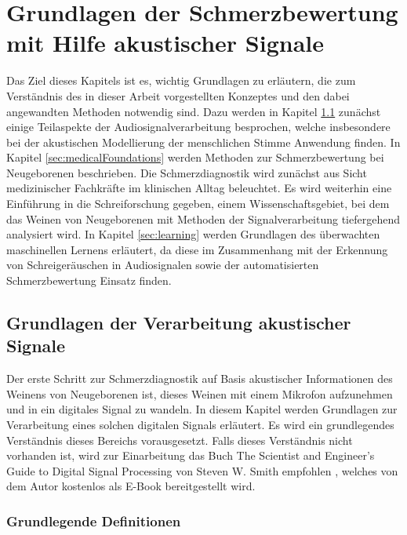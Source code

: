 \chapter{Grundlagen der Schmerzbewertung mit Hilfe akustischer Signale}
\label{sec:foundations}

Das Ziel dieses Kapitels ist es, wichtig Grundlagen zu erläutern, die zum Verständnis des in dieser Arbeit vorgestellten Konzeptes und den dabei angewandten Methoden notwendig sind. Dazu werden in Kapitel \ref{sec:signal_foundations} zunächst einige Teilaspekte der Audiosignalverarbeitung besprochen, welche insbesondere bei der akustischen Modellierung der menschlichen Stimme Anwendung finden. In Kapitel \ref{sec:medicalFoundations} werden Methoden zur Schmerzbewertung bei Neugeborenen beschrieben. Die Schmerzdiagnostik wird zunächst aus Sicht medizinischer Fachkräfte im klinischen Alltag beleuchtet. Es wird weiterhin eine Einführung in die \glqq Schreiforschung\grqq{} gegeben, einem Wissenschaftsgebiet, bei dem das Weinen von Neugeborenen mit Methoden der Signalverarbeitung tiefergehend analysiert wird. In Kapitel \ref{sec:learning} werden Grundlagen des überwachten maschinellen Lernens erläutert, da diese im Zusammenhang mit der Erkennung von Schreigeräuschen in Audiosignalen sowie der automatisierten Schmerzbewertung Einsatz finden.

\section{Grundlagen der Verarbeitung akustischer Signale}
\label{sec:signal_foundations}

Der erste Schritt zur Schmerzdiagnostik auf Basis akustischer Informationen des Weinens von Neugeborenen ist, dieses Weinen mit einem Mikrofon aufzunehmen und in ein digitales Signal zu wandeln. In diesem Kapitel werden Grundlagen zur Verarbeitung eines solchen digitalen Signals erläutert. Es wird ein grundlegendes Verständnis dieses Bereichs vorausgesetzt. Falls dieses Verständnis nicht vorhanden ist, wird zur Einarbeitung das Buch \glqq The Scientist and Engineer's Guide to Digital Signal Processing\grqq{} von Steven W. Smith empfohlen \cite{dspGuide}, welches von dem Autor kostenlos als E-Book bereitgestellt wird.

\subsection{Grundlegende Definitionen}

